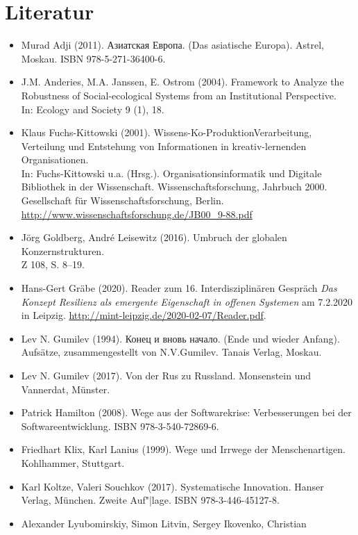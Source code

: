 \documentclass[11pt,a4paper]{article}
\begin{document}
\section{Literatur}
\raggedright
\begin{itemize}
\item Murad Adji (2011). \foreignlanguage{russian}{Азиатская Европа}. (Das
  asiatische Europa).  Astrel, Moskau. ISBN 978-5-271-36400-6.
\item J.M. Anderies, M.A. Janssen, E. Ostrom (2004).  Framework to
  Analyze the Robustness of Social-ecological Systems from an Institutional
  Perspective.\\ In: Ecology and Society 9 (1), 18. 
\item Klaus Fuchs-Kittowski (2001). Wissens-Ko-ProduktionVerarbeitung,
  Verteilung und Entstehung von Informationen in kreativ-lernenden
  Organisationen.\\ In: Fuchs-Kittowski u.a. (Hrsg.). Organisationsinformatik
  und Digitale Bibliothek in der Wissenschaft. Wissenschaftsforschung,
  Jahrbuch 2000. Gesellschaft für Wissenschaftsforschung, Berlin.
  \url{http://www.wissenschaftsforschung.de/JB00_9-88.pdf}
\item Jörg Goldberg, André Leisewitz (2016). Umbruch der globalen
  Konzernstrukturen.\\ Z 108, S. 8--19.
\item Hans-Gert Gräbe (2020). Reader zum 16. Interdisziplinären Gespräch
  \emph{Das Konzept Resilienz als emergente Eigenschaft in offenen Systemen}
  am 7.2.2020 in Leipzig. \url{http://mint-leipzig.de/2020-02-07/Reader.pdf}.
\item Lev N. Gumilev (1994). \foreignlanguage{russian}{Конец и вновь начало}.
  (Ende und wieder Anfang).  Aufsätze, zusammengestellt von
  N.V.Gumilev. Tanais Verlag, Moskau.
\item Lev N. Gumilev (2017). Von der Rus zu Russland. Monsenstein und
  Vannerdat, Münster.
\item Patrick Hamilton (2008). Wege aus der Softwarekrise:
  Verbesserungen bei der Softwareentwicklung. ISBN 978-3-540-72869-6. 
\item Friedhart Klix, Karl Lanius (1999). Wege und Irrwege der
  Menschenartigen.  Kohlhammer, Stuttgart.
\item Karl Koltze, Valeri Souchkov (2017). Systematische Innovation. Hanser
  Verlag, München. Zweite Auf"|lage. ISBN 978-3-446-45127-8.
\item Alexander Lyubomirskiy, Simon Litvin, Sergey Ikovenko, Christian

\end{itemize}
\end{document}
